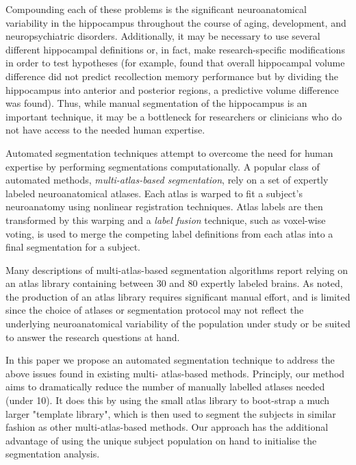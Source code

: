 \documentclass{article}\usepackage{graphicx, color}
\begin{document}
Compounding each of these problems is the significant neuroanatomical
variability in the hippocampus throughout the course of aging, development, and
neuropsychiatric disorders\cite{Mouiha2011}.  Additionally, it may be necessary
to use several different hippocampal definitions or, in fact, make
research-specific modifications in order to test hypotheses (for example,
\cite{Poppenk2011} found that overall hippocampal volume difference did not
predict recollection memory performance but by dividing the hippocampus into
anterior and posterior regions, a predictive volume difference was found).
Thus, while manual segmentation of the hippocampus is an important technique,
it may be a bottleneck for researchers or clinicians who do not have access to
the needed human expertise.

Automated segmentation techniques attempt to overcome the need for human
expertise by performing segmentations computationally.  A popular class of
automated methods, {\it multi-atlas-based segmentation}, rely on a set of
expertly labeled neuroanatomical atlases. Each atlas is warped to fit a
subject's neuroanatomy using nonlinear registration
techniques\cite{Collins1995,Klein2009}.  Atlas labels are then transformed
by this warping and a {\it label fusion} technique, such as voxel-wise
voting, is used to merge the competing label definitions from each atlas into a
final segmentation for a subject.  

Many descriptions of multi-atlas-based segmentation algorithms report relying on an
atlas library containing between 30 and 80 expertly labeled
brains\cite{Heckemann2011,Collins2010,Aljabar2009,Leung2010,Lotjonen2010}.
As noted, the production of an atlas library requires significant manual
effort, and is limited since the choice of atlases or segmentation protocol may
not reflect the underlying neuroanatomical variability of the population under
study or be suited to answer the research questions at hand.

In this paper we propose an automated segmentation technique to address the
above issues found in existing multi- atlas-based methods. Principly, our
method aims to dramatically reduce the number of manually labelled atlases
needed (under 10). It does this by using the small atlas library to boot-strap
a much larger "template library", which is then used to segment the subjects in
similar fashion as other multi-atlas-based methods. Our approach has the
additional advantage of using the unique subject population on hand to
initialise the segmentation analysis.
\end{document}

